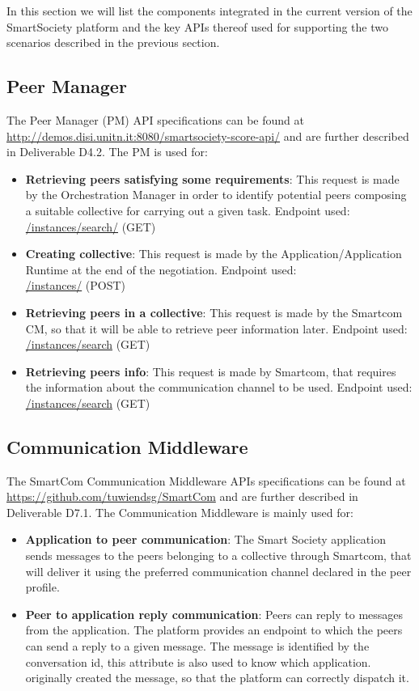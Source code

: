 In this section we will list the components integrated in the current
version of the SmartSociety platform and the key APIs thereof
used for supporting the two scenarios described in the previous
section.

\subsection{Peer Manager}
The Peer Manager (PM) API specifications can be found at
\url{http://demos.disi.unitn.it:8080/smartsociety-score-api/} and are further
described in Deliverable D4.2. The PM is used for:
\begin{itemize}
\item {\bf Retrieving peers satisfying some requirements}: This
  request is made by the Orchestration Manager in order to identify
  potential peers composing a suitable collective for carrying out a
  given task. Endpoint used:\\
	\url{/instances/search/} (\textsc{GET})
\item {\bf Creating collective}: This request is made by the Application/Application Runtime at the end of the negotiation. Endpoint used:\\
	\url{/instances/} (\textsc{POST})
\item {\bf Retrieving peers in a collective}: This request is made by
  the Smartcom CM, so that it will be able to retrieve peer information later. Endpoint used:\\
	\url{/instances/search} (\textsc{GET})
\item {\bf Retrieving peers info}: This request is made by Smartcom, that requires the information about the communication channel to be used. Endpoint used:\\
	\url{/instances/search} (\textsc{GET})	
\end{itemize}


\subsection{Communication Middleware}
The SmartCom Communication Middleware APIs specifications can be found at 
\url{https://github.com/tuwiendsg/SmartCom} and are further described in Deliverable D7.1. The Communication Middleware is mainly used for:
\begin{itemize}
\item {\bf Application to peer communication}: The Smart Society application sends messages to the peers belonging to a collective through Smartcom, that will deliver it using the preferred communication channel declared in the peer profile.
\item {\bf Peer to application reply communication}: Peers can reply to messages from the application. The platform provides an endpoint to which the peers can send a reply to a given message. The message is identified by the conversation id, this attribute is also used to know which application.
originally created the message, so that the platform can correctly dispatch it. 
\end{itemize}

